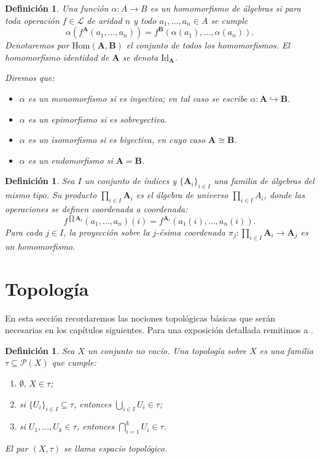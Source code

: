 \documentclass[12pt]{book}
\newtheorem{definition}[theorem]{Definición}
\newcommand{\Hom}{\mathrm{Hom}}
\newcommand{\Id}{\mathrm{Id}}
\begin{document}
\begin{definition}\label{def:homomorfismo}
Una función \( \alpha\colon A\to B \) es un \emph{homomorfismo} de álgebras
si para toda operación \( f\in\mathcal{L} \) de aridad \( n \) y todo
\( a_{1},\dots,a_{n}\in A \) se cumple
\[
\alpha(f^{\mathbf{A}}(a_{1},\dots,a_{n})) = f^{\mathbf{B}}(\alpha(a_{1}),\dots,\alpha(a_{n})).
\]
Denotaremos por \( \Hom(\mathbf{A},\mathbf{B}) \) el conjunto de todos los homomorfismos.  
El homomorfismo identidad de \( \mathbf{A} \) se denota \( \Id_{\mathbf{A}} \).  

Diremos que:
\begin{itemize}
  \item \(\alpha\) es un \emph{monomorfismo} si es inyectiva; en tal caso se escribe
  \( \alpha\colon \mathbf{A} \hookrightarrow \mathbf{B} \).
  \item \(\alpha\) es un \emph{epimorfismo} si es sobreyectiva.
  \item \(\alpha\) es un \emph{isomorfismo} si es biyectiva, en cuyo caso
  \( \mathbf{A}\cong\mathbf{B} \).
  \item \(\alpha\) es un \emph{endomorfismo} si \( \mathbf{A}=\mathbf{B} \).
\end{itemize}
\end{definition}

\begin{definition}\label{def:producto-algebras}
Sea \( I \) un conjunto de índices y \( \{\mathbf{A}_{i}\}_{i\in I} \) una familia de álgebras del mismo tipo.
Su \emph{producto} \( \prod_{i\in I}\mathbf{A}_{i} \) es el álgebra de universo
\( \prod_{i\in I}A_{i} \), donde las operaciones se definen coordenada a coordenada:
\[
f^{\prod \mathbf{A}_{i}}(a_{1},\dots,a_{n})(i) = 
f^{\mathbf{A}_{i}}(a_{1}(i),\dots,a_{n}(i)).
\]
Para cada \( j\in I \), la proyección sobre la \( j \)-ésima coordenada
\(\pi_{j}\colon \prod_{i\in I}\mathbf{A}_{i}\to \mathbf{A}_{j}\) es un homomorfismo.
\end{definition}

\section{Topología}

En esta sección recordaremos las nociones topológicas básicas que serán necesarias en los capítulos siguientes.
Para una exposición detallada remitimos a \cite{Munkres}.

\begin{definition}\label{def:topologia}
Sea \( X \) un conjunto no vacío.  
Una \emph{topología} sobre \( X \) es una familia \( \tau \subseteq \mathcal{P}(X) \)
que cumple:
\begin{enumerate}
  \item \( \emptyset,\, X \in \tau \);
  \item si \( \{U_i\}_{i\in I} \subseteq \tau \), entonces \( \bigcup_{i\in I} U_i \in \tau \);
  \item si \( U_1,\dots,U_k \in \tau \), entonces \( \bigcap_{i=1}^{k} U_i \in \tau \).
\end{enumerate}
El par \( (X,\tau) \) se llama \emph{espacio topológico}.
\end{definition}
\end{document}
